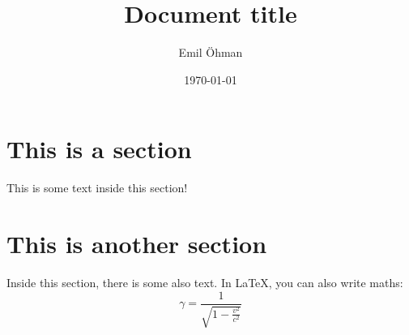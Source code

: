 \documentclass[a4paper]{article}
\title{Document title}
\author{Emil Öhman}
\date{\today}
\begin{document}
\thispagestyle{plain} %

\maketitle %

\tableofcontents

\section{This is a section}
This is some text inside this section!

\section{This is another section}
Inside this section, there is some also text. In \LaTeX, you can also write maths:
\begin{equation*}
    \gamma=\frac{1}{\sqrt{1-{\frac{v^2}{c^2}}}}
\end{equation*}
\end{document}
